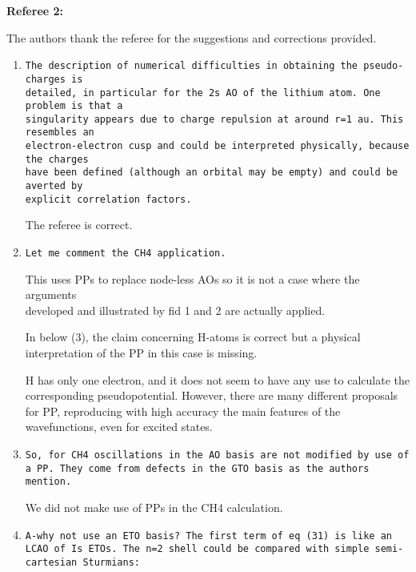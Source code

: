 \documentclass[10pt]{article}
\begin{document}
\noindent
{\bf Referee 2:} 

\vspace{0.2cm}
The authors thank the referee for the suggestions and corrections provided.

\begin{enumerate}

 \item {\tt The description of numerical difficulties in obtaining 
 the pseudo-charges is \\ detailed, in particular for the 2s AO of the 
 lithium atom. One problem is that a \\ singularity appears due to charge 
 repulsion at around r=1 au. This resembles an \\ electron-electron cusp 
 and could be interpreted physically, because the charges \\ have been 
 defined (although an orbital may be empty) and could be averted by 
 \\ explicit correlation factors.}
 
 The referee is correct.
 
 \item {\tt Let me comment the CH4 application.
 
 This uses PPs to replace node-less AOs so it is not a case
 where the arguments \\ developed and illustrated by fid 1 and 2 are
 actually applied.
 
 In below (3), the claim concerning H-atoms is correct but 
 a physical \\ interpretation of the PP in this case is missing.}
 
 H has only one electron, and it does not seem to have any use to
 calculate the corresponding pseudopotential.
 However, there are many different proposals for PP, reproducing
 with high accuracy the main features of the wavefunctions, even
 for excited states.
 
 \item {\tt So, for CH4 oscillations in the AO basis are not modified
 by use of a PP. They come from defects in the GTO basis as the authors
 mention. }
 
 We did not make use of PPs in the CH4 calculation.
 
 \item {\tt A-why not use an ETO basis? The first term of eq (31) is 
 like an LCAO of Is ETOs.
 The n=2 shell could be compared with simple semi-cartesian Sturmians:

}
\end{enumerate}
\end{document}
